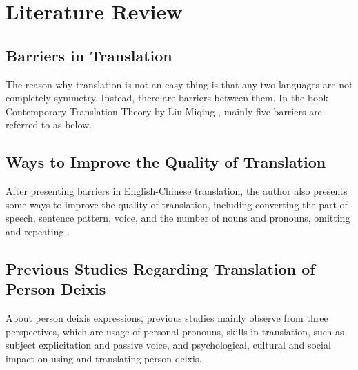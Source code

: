 \documentclass[degree=bachelor,language=english]{thuthesis}
\begin{document}
\chapter{Literature Review}

\section{Barriers in Translation}

The reason why translation is not an easy thing is that any two languages are not completely symmetry. Instead, there are barriers between them. In the book Contemporary Translation Theory by Liu Miqing %
\citep{liu2005dangdai}, mainly five barriers are referred to as below.



\section{Ways to Improve the Quality of Translation}

After presenting barriers in English-Chinese translation, the author also presents some ways to improve the quality of translation, including converting the part-of-speech, sentence pattern, voice, and the number of nouns and pronouns, omitting and repeating %
\citep{liu2005dangdai}.



\section{Previous Studies Regarding Translation of Person Deixis }

About person deixis expressions, previous studies mainly observe from three perspectives, which are usage of personal pronouns, skills in translation, such as subject explicitation and passive voice, and psychological, cultural and social impact on using and translating person deixis.
\end{document}
